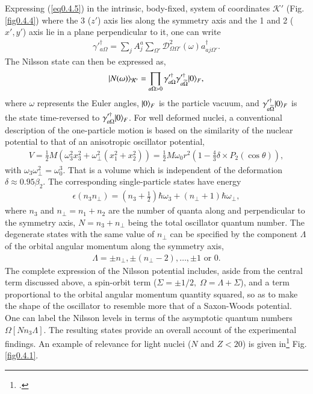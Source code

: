 Expressing (\ref{eq0.4.5}) in the intrinsic, body-fixed, system of coordinates $\mathcal K'$ (Fig. \ref{fig0.4.4}) where the 3 ($z'$) axis lies along the symmetry axis and the 1 and 2 ($x',y'$) axis lie in a plane perpendicular to it, one can write
\begin{align}\label{eq0.4.6}
\gamma'^{\dagger}_{a\Omega}=\sum_jA_j^a\sum_{\Omega'}\mathcal D_{\Omega\Omega'}^2(\omega)a^\dagger_{aj\Omega'}.
\end{align}
The Nilsson state can then be expressed as, 
\begin{align}\label{eq0.4.7}
|{N(\omega)} \rangle_{\mathcal K'}=\prod_{a\Omega>0}\gamma'^{\dagger}_{a\Omega}\gamma'^{\dagger}_{a\widetilde\Omega}|{0} \rangle_F,
\end{align}
where $\omega$ represents the Euler angles, $|{0} \rangle_F$ is the particle vacuum, and $\gamma'^{\dagger}_{a\widetilde\Omega}|{0} \rangle_F$ is the state time-reversed to $\gamma'^{\dagger}_{a\Omega}|{0} \rangle_F$. For well deformed nuclei, a conventional description of the one-particle motion is based on the similarity of the nuclear potential to that of an anisotropic oscillator potential, 
\begin{align}\label{eq0.4.8}
V=\frac{1}{2}M\left(\omega_3^2x_3^2+\omega^2_{\perp}(x_1^2+x_2^2)\right)=\frac{1}{2}M\omega_0r^2\left(1-\frac{4}{3}\delta\times P_2(\cos\theta)\right),
\end{align}
with $\omega_3\omega_{\perp}^2=\omega_0^3$. That is a volume which is independent of the deformation $\delta\approx0.95\beta_2$. The corresponding single-particle states have energy
\begin{align}\label{eq0.4.9}
\epsilon(n_3n_{\perp})=(n_3+\tfrac{1}{2})\hbar\omega_3+(n_{\perp}+1)\hbar\omega_{\perp},
\end{align}
where $n_3$ and $n_{\perp}=n_1+n_2$ are the number of quanta along and perpendicular to the symmetry axis, $N=n_3+n_{\perp}$ being the total oscillator quantum number. The degenerate states with the same value of $n_{\perp}$ can be specified by the component $\Lambda$ of the orbital angular momentum along the symmetry axis,
\begin{align}\label{eq0.4.10}
\Lambda=\pm n_{\perp}, \pm(n_{\perp}-2),\dots,\pm 1\text{ or } 0.
\end{align}
The complete expression of the Nilsson potential includes, aside from the central term discussed above, a spin-orbit term ($\Sigma=\pm1/2,\;\Omega=\Lambda+\Sigma$), and a term proportional to the orbital angular momentum quantity squared, so as to make the shape of the oscillator to resemble more that of a Saxon-Woods potential. One can  label the Nilsson levels in terms of the asymptotic quantum numbers $\Omega[Nn_3\Lambda]$. The resulting states provide an overall account of the experimental findings. An example of relevance for light nuclei ($N$ and $Z<20$) is given in\footnote{\cite{Mottelson:59}.} Fig. \ref{fig0.4.1}.

